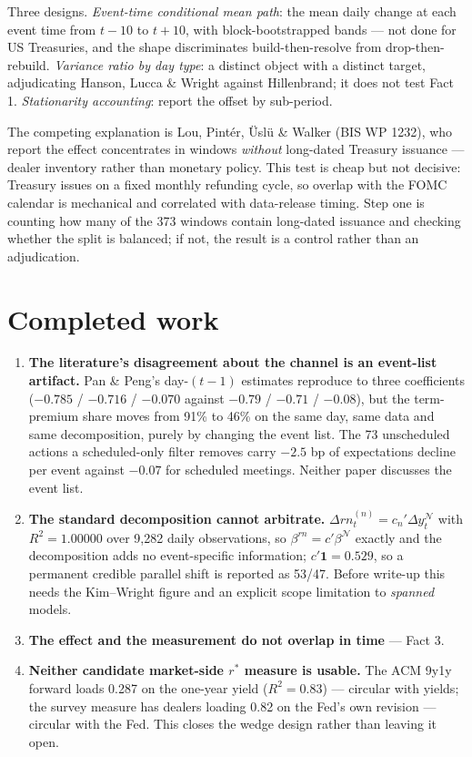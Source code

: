\documentclass[11pt]{article}
\newcommand{\rs}{$r^{*}$}
\begin{document}
Three designs. \emph{Event-time conditional mean path}: the mean daily change at each event time
from $t-10$ to $t+10$, with block-bootstrapped bands --- not done for US Treasuries, and the
shape discriminates build-then-resolve from drop-then-rebuild. \emph{Variance ratio by day type}:
a distinct object with a distinct target, adjudicating Hanson, Lucca \& Wright against
Hillenbrand; it does not test Fact 1. \emph{Stationarity accounting}: report the offset by
sub-period.

The competing explanation is Lou, Pintér, Üslü \& Walker (BIS WP 1232), who report the effect
concentrates in windows \emph{without} long-dated Treasury issuance --- dealer inventory rather
than monetary policy. This test is cheap but not decisive: Treasury issues on a fixed monthly
refunding cycle, so overlap with the FOMC calendar is mechanical and correlated with data-release
timing. Step one is counting how many of the 373 windows contain long-dated issuance and checking
whether the split is balanced; if not, the result is a control rather than an adjudication.

\section{Completed work}

\begin{enumerate}\setlength\itemsep{0.15em}
\item \textbf{The literature's disagreement about the channel is an event-list artifact.} Pan \&
Peng's day-$(t-1)$ estimates reproduce to three coefficients ($-0.785$ / $-0.716$ / $-0.070$
against $-0.79$ / $-0.71$ / $-0.08$), but the term-premium share moves from 91\% to 46\% on the
same day, same data and same decomposition, purely by changing the event list. The 73 unscheduled
actions a scheduled-only filter removes carry $-2.5$ bp of expectations decline per event against
$-0.07$ for scheduled meetings. Neither paper discusses the event list.
\item \textbf{The standard decomposition cannot arbitrate.} $\Delta rn^{(n)}_t = c_n'\Delta
y^{\mathcal N}_t$ with $R^2 = 1.00000$ over 9{,}282 daily observations, so
$\beta^{rn} = c'\beta^{\mathcal N}$ exactly and the decomposition adds no event-specific
information; $c'\mathbf 1 = 0.529$, so a permanent credible parallel shift is reported as 53/47.
Before write-up this needs the Kim--Wright figure and an explicit scope limitation to
\emph{spanned} models.
\item \textbf{The effect and the measurement do not overlap in time} --- Fact 3.
\item \textbf{Neither candidate market-side \rs{} measure is usable.} The ACM 9y1y forward loads
0.287 on the one-year yield ($R^2 = 0.83$) --- circular with yields; the survey measure has
dealers loading 0.82 on the Fed's own revision --- circular with the Fed. This closes the wedge
design rather than leaving it open.
\end{enumerate}
\end{document}
